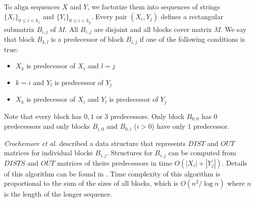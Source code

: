 To align sequences $X$ and $Y$, we factorize them into sequences of strings
$\{X_i\}_{0\leq i < k_x}$ and $\{Y_i\}_{0\leq i<k_y}$.  Every pair $(X_i,Y_j)$
defines a rectangular submatrix $B_{i,j}$ of $M$.  All $B_{i,j}$ are
disjoint and all blocks cover matrix $M$. We say that block $B_{k,l}$ is
a predecessor of block $B_{i,j}$ if one of the following conditions is true:


\begin{itemize}
\item $X_k$ is predecessor of $X_i$ and $l=j$
\item $k=i$ and $Y_l$ is predecessor of $Y_j$
\item $X_k$ is predecessor of $X_i$ and $Y_l$ is predecessor of $Y_j$
\end{itemize}

Note that every block has $0,1$ or $3$ predecessors. Only block
$B_{0,0}$ has $0$ predecessors and only blocks $B_{i,0}$ and $B_{0,i}$
($i>0$) have only $1$ predecessor.  

{\it Crochemore et al.} described a data structure that represents $DIST$ and $OUT$
matrices for  \nocite{Crochemore2002} individual blocks $B_{i,j}$. Structures
for $B_{i,j}$ can be
computed from $DISTS$ and $OUT$ matrices of theirs predecessors in time
$O(|X_i|+|Y_j|)$. Details of this algorithm can be found in
\cite{Crochemore2002}. Time complexity of this algorithm is proportional to the
sum of the sizes of all blocks, which is $O(n^2/\log n)$ where $n$ is the length
of the longer sequence.




